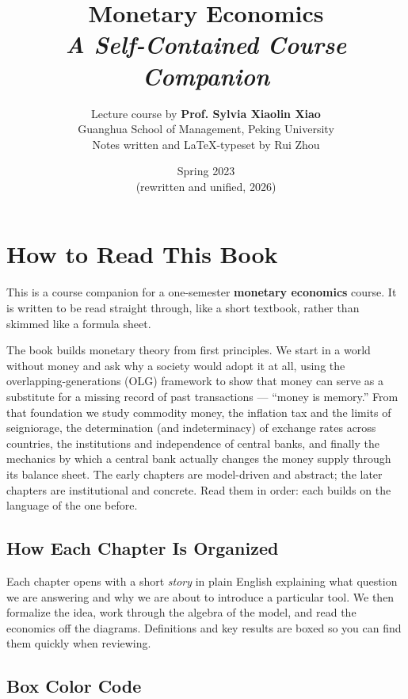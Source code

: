 \documentclass[oneside]{book}
\def\notetitle{Monetary Economics}
\def\notesubtitle{A Self-Contained Course Companion}
\def\noteauthor{Lecture course by \textbf{Prof. Sylvia Xiaolin Xiao} \\
    Guanghua School of Management, Peking University \\
    \vspace{0.5em}
    Notes written and {\LaTeX}-typeset by Rui Zhou}
\def\notedate{Spring 2023 \\ \small (rewritten and unified, 2026)}
\begin{document}
\title{\textbf{
    \LARGE{\notetitle}\\
    \vspace{0.5em}
    \large\textit{\notesubtitle}
    \vspace*{8\baselineskip}}
}
\author{\noteauthor}
\date{\notedate}

\maketitle
\newpage

\thispagestyle{empty}
\section*{How to Read This Book}

This is a course companion for a one-semester \textbf{monetary economics} course. It is written to be read straight through, like a short textbook, rather than skimmed like a formula sheet.

The book builds monetary theory from first principles. We start in a world without money and ask why a society would adopt it at all, using the overlapping-generations (OLG) framework to show that money can serve as a substitute for a missing record of past transactions --- ``money is memory.'' From that foundation we study commodity money, the inflation tax and the limits of seigniorage, the determination (and indeterminacy) of exchange rates across countries, the institutions and independence of central banks, and finally the mechanics by which a central bank actually changes the money supply through its balance sheet. The early chapters are model-driven and abstract; the later chapters are institutional and concrete. Read them in order: each builds on the language of the one before.

\subsection*{How Each Chapter Is Organized}

Each chapter opens with a short \emph{story} in plain English explaining what question we are answering and why we are about to introduce a particular tool. We then formalize the idea, work through the algebra of the model, and read the economics off the diagrams. Definitions and key results are boxed so you can find them quickly when reviewing.

\subsection*{Box Color Code}
\end{document}
